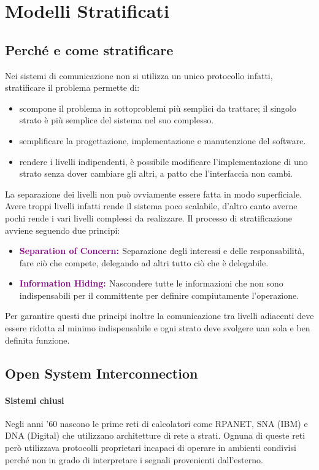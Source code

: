 \section{Modelli Stratificati}
\subsection{Perché e come stratificare}
Nei sistemi di comunicazione non si utilizza un unico protocollo infatti, stratificare il problema permette di:
\begin{itemize}
    \item scompone il problema in sottoproblemi più semplici da trattare; il singolo strato è più semplice del sistema nel suo complesso.
    \item semplificare la progettazione, implementazione e manutenzione del software.
    \item rendere i livelli indipendenti, è possibile modificare l’implementazione di uno strato senza dover cambiare gli altri, a patto che l’interfaccia non cambi.
\end{itemize}

La separazione dei livelli non può ovviamente essere fatta in modo superficiale. Avere troppi livelli infatti rende il sistema poco scalabile, d'altro canto averne pochi rende i vari livelli complessi da realizzare. 
\newline Il processo di stratificazione avviene seguendo due principi:
\begin{itemize}
    \item \textbf{\textcolor{purple}{Separation of Concern: }}Separazione degli interessi e delle responsabilità, fare ciò che compete, delegando ad altri tutto ciò che è delegabile.
    \item \textbf{\textcolor{purple}{Information Hiding: }}Nascondere tutte le informazioni che non sono indispensabili per il committente per definire compiutamente l'operazione.
\end{itemize}
Per garantire questi due principi inoltre la comunicazione tra livelli adiacenti deve essere ridotta al minimo indispensabile e ogni strato deve svolgere uan sola e ben definita funzione.

\subsection{Open System Interconnection}
\paragraph{Sistemi chiusi} Negli anni '60 nascono le prime reti di calcolatori come RPANET, SNA (IBM) e DNA (Digital) che utilizzano architetture di rete a strati. Ognuna di queste reti però utilizzava protocolli proprietari incapaci di operare in ambienti condivisi perché non in grado di interpretare i segnali provenienti dall'esterno.

